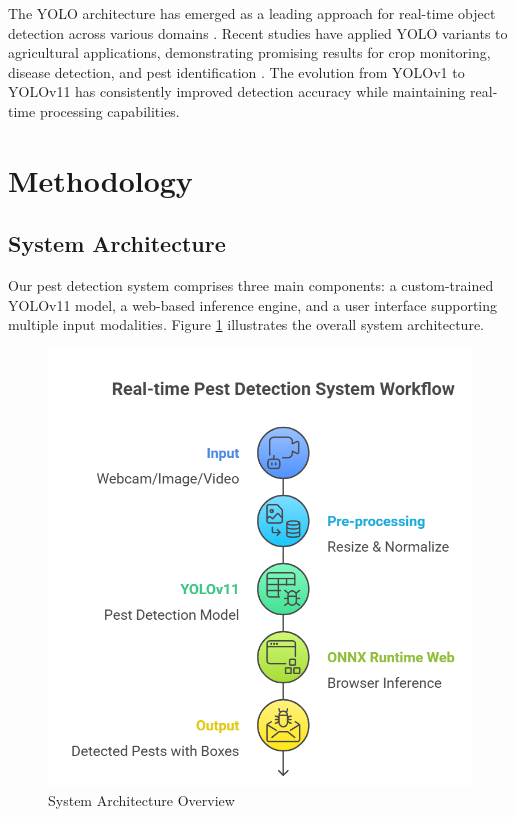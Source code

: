 \documentclass[conference]{IEEEtran}
\begin{document}
The YOLO architecture has emerged as a leading approach for real-time object detection across various domains \cite{ref7}. Recent studies have applied YOLO variants to agricultural applications, demonstrating promising results for crop monitoring, disease detection, and pest identification \cite{ref8}. The evolution from YOLOv1 to YOLOv11 has consistently improved detection accuracy while maintaining real-time processing capabilities.

\section{Methodology}

\subsection{System Architecture}

Our pest detection system comprises three main components: a custom-trained YOLOv11 model, a web-based inference engine, and a user interface supporting multiple input modalities. Figure \ref{fig:architecture} illustrates the overall system architecture.

\begin{figure}[htbp]
\centerline{\includegraphics[width=\columnwidth]{architecture.png}}
\caption{System Architecture Overview}
\label{fig:architecture}
\end{figure}
\end{document}
